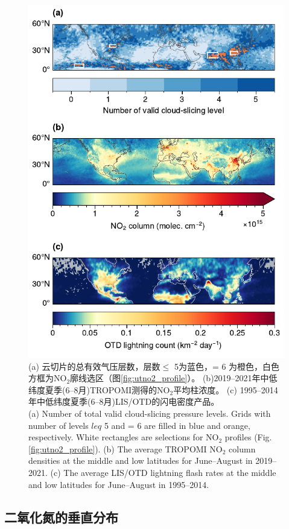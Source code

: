\begin{figure}[!htbp]
    \centering
    \includegraphics[width=12cm]{./figures/no2_ltngcount.pdf}
    \caption{
    (a) 云切片的总有效气压层数，层数$\leq$ 5为蓝色，= 6 为橙色，白色方框为NO$_2$廓线选区（图\ref{fig:utno2_profile}）。
    (b)2019--2021年中低纬度夏季(6--8月)TROPOMI测得的NO$_2$平均柱浓度。
    (c) 1995--2014年中低纬度夏季(6--8月)LIS/OTD的闪电密度产品。 \\
    (a) Number of total valid cloud-slicing pressure levels.
    Grids with number of levels $leq$ 5 and = 6 are filled in blue and orange, respectively.
    White rectangles are selections for NO$_2$ profiles (Fig. \ref{fig:utno2_profile}).
    (b) The average TROPOMI NO$_2$ column densities at the middle and low latitudes for June--August in 2019--2021.
    (c) The average LIS/OTD lightning flash rates at the middle and low latitudes for June--August in 1995--2014.
    }
    \label{fig:no2_ltngcount}
\end{figure}

\subsection{二氧化氮的垂直分布}


